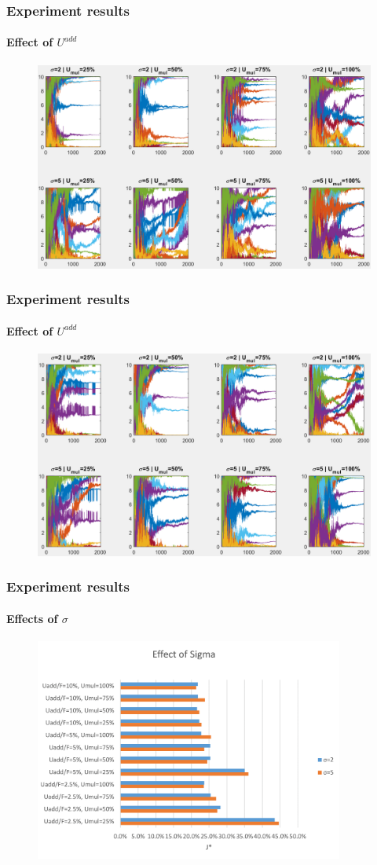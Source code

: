 \documentclass[fleqn]{beamer}
\begin{document}
\begin{frame}
	\frametitle{Experiment results}
	\framesubtitle{Effect of $U^{add}$}
	\begin{figure}
		\centering
		\includegraphics[width=4.5in]{figures/results_figures/Uadd/knobs_Uadd_5_lambda_11.png}
	\end{figure}
\end{frame}

\begin{frame}
	\frametitle{Experiment results}
	\framesubtitle{Effect of $U^{add}$}
	\begin{figure}
		\centering
		\includegraphics[width=4.5in]{figures/results_figures/Uadd/knobs_Uadd_10_lambda_11.png}
	\end{figure}
\end{frame}

\begin{frame}
	\frametitle{Experiment results}
	\framesubtitle{Effects of $\sigma$}
	\begin{figure}
		\centering
		\includegraphics[width=4in]{figures/sigma.png}
	\end{figure}
\end{frame}
\end{document}

